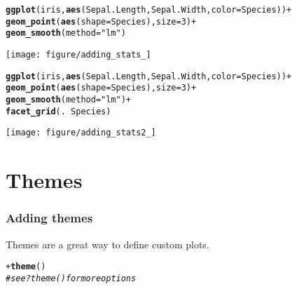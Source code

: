 \documentclass{beamer}\usepackage[]{graphicx}\usepackage[]{color}
\makeatletter
\newcommand{\hlstr}[1]{\textcolor[rgb]{0.192,0.494,0.8}{#1}}%
\newcommand{\hlcom}[1]{\textcolor[rgb]{0.678,0.584,0.686}{\textit{#1}}}%
\newcommand{\hlkwd}[1]{\textcolor[rgb]{0.737,0.353,0.396}{\textbf{#1}}}%
\newenvironment{kframe}{%
 \def\at@end@of@kframe{}%
 \ifinner\ifhmode%
  \def\at@end@of@kframe{\end{minipage}}%
  \begin{minipage}{\columnwidth}%
 \fi\fi%
 \def\FrameCommand##1{\hskip\@totalleftmargin \hskip-\fboxsep
 \colorbox{shadecolor}{##1}\hskip-\fboxsep
     \hskip-\linewidth \hskip-\@totalleftmargin \hskip\columnwidth}%
 \MakeFramed {\advance\hsize-\width
   \@totalleftmargin\z@ \linewidth\hsize
   \@setminipage}}%
 {\par\unskip\endMakeFramed%
 \at@end@of@kframe}
\newenvironment{knitrout}{}{} %
\makeatother
\begin{document}
\begin{frame}[fragile]
\begin{knitrout}\footnotesize
{}\color{fgcolor}\begin{kframe}
\begin{alltt}
\hlkwd{ggplot}(iris, \hlkwd{aes}(Sepal.Length, Sepal.Width, color = Species)) +
\hlkwd{geom_point}(\hlkwd{aes}(shape = Species), size = 3) +
\hlkwd{geom_smooth}(method = \hlstr{"lm"})
\end{alltt}
\end{kframe}

{\centering \texttt{[image: figure/adding\_stats\_]} 

}



\end{knitrout}

\end{frame}

\begin{frame}[fragile]
\begin{knitrout}\footnotesize
{}\color{fgcolor}\begin{kframe}
\begin{alltt}
\hlkwd{ggplot}(iris, \hlkwd{aes}(Sepal.Length, Sepal.Width, color = Species)) +
\hlkwd{geom_point}(\hlkwd{aes}(shape = Species), size = 3) +
\hlkwd{geom_smooth}(method = \hlstr{"lm"}) +
\hlkwd{facet_grid}(. ~ Species)
\end{alltt}
\end{kframe}

{\centering \texttt{[image: figure/adding\_stats2\_]} 

}



\end{knitrout}

\end{frame}

\section*{Themes}
\frame{\sectionpage}

\begin{frame}[fragile]
\frametitle{Adding themes}
Themes are a great way to define custom plots.
\begin{knitrout}\footnotesize
{}\color{fgcolor}\begin{kframe}
\begin{alltt}
+\hlkwd{theme}()
\hlcom{# see ?theme() for more options}
\end{alltt}
\end{kframe}
\end{knitrout}


\end{frame}
\end{document}
